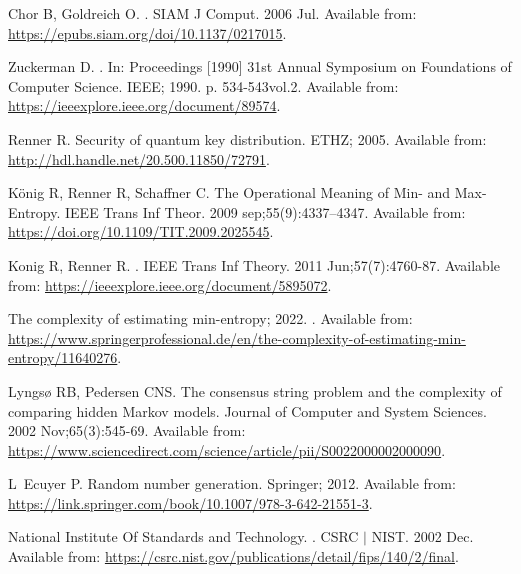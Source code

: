 \documentclass[]{interact}
\theoremstyle{plain}%
\theoremstyle{definition}
\theoremstyle{remark}
\begin{document}
\begin{thebibliography}{100}
Chor B, Goldreich O.
.
\newblock SIAM J Comput. 2006 Jul.
\newblock Available from: \url{https://epubs.siam.org/doi/10.1137/0217015}.

Zuckerman D.
.
\newblock In: {Proceedings [1990] 31st Annual Symposium on Foundations of
  Computer Science}. IEEE; 1990. p. 534-543vol.2.
\newblock Available from: \url{https://ieeexplore.ieee.org/document/89574}.

Renner R.
\newblock Security of quantum key distribution.
\newblock ETHZ; 2005.
\newblock Available from: \url{http://hdl.handle.net/20.500.11850/72791}.

K\"{o}nig R, Renner R, Schaffner C.
\newblock The Operational Meaning of Min- and Max-Entropy.
\newblock IEEE Trans Inf Theor. 2009 sep;55(9):4337–4347.
\newblock Available from: \url{https://doi.org/10.1109/TIT.2009.2025545}.

Konig R, Renner R.
.
\newblock IEEE Trans Inf Theory. 2011 Jun;57(7):4760-87.
\newblock Available from: \url{https://ieeexplore.ieee.org/document/5895072}.

{The complexity of estimating min-entropy}; 2022.
.
\newblock Available from:
  \url{https://www.springerprofessional.de/en/the-complexity-of-estimating-min-entropy/11640276}.

Lyngs{\o} RB, Pedersen CNS.
\newblock The consensus string problem and the complexity of comparing hidden
  Markov models.
\newblock Journal of Computer and System Sciences. 2002 Nov;65(3):545-69.
\newblock Available from:
  \url{https://www.sciencedirect.com/science/article/pii/S0022000002000090}.

L~Ecuyer P.
\newblock Random number generation.
\newblock Springer; 2012.
\newblock Available from:
  \url{https://link.springer.com/book/10.1007/978-3-642-21551-3}.

{National Institute Of Standards and Technology}.
.
\newblock CSRC {$\vert$} NIST. 2002 Dec.
\newblock Available from:
  \url{https://csrc.nist.gov/publications/detail/fips/140/2/final}.


\end{thebibliography}
\end{document}
